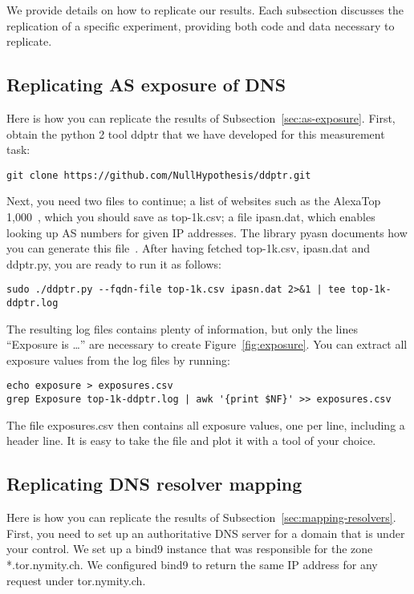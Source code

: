 \appendix

We provide details on how to replicate our results.  Each
subsection discusses the replication of a specific experiment, providing both
code and data necessary to replicate.

\subsection{Replicating AS exposure of DNS}
Here is how you can replicate the results of Subsection~\ref{sec:as-exposure}.
First, obtain the python 2 tool ddptr that we have developed for this
measurement task:

\begin{lstlisting}
git clone https://github.com/NullHypothesis/ddptr.git
\end{lstlisting}

Next, you need two files to continue; \first a list of websites such as the
AlexaTop 1,000~\cite{alexatop1k}, which you should save as top-1k.csv; \second a
file ipasn.dat, which enables looking up AS numbers for given IP addresses.  The
library pyasn documents how you can generate this file~\cite{pyasn}.  After
having fetched top-1k.csv, ipasn.dat and ddptr.py, you are ready to run it as
follows:

\begin{lstlisting}
sudo ./ddptr.py --fqdn-file top-1k.csv ipasn.dat 2>&1 | tee top-1k-ddptr.log
\end{lstlisting}

The resulting log files contains plenty of information, but only the lines
``Exposure is \ldots'' are necessary to create Figure~\ref{fig:exposure}.  You
can extract all exposure values from the log files by running:

\begin{lstlisting}
echo exposure > exposures.csv
grep Exposure top-1k-ddptr.log | awk '{print $NF}' >> exposures.csv
\end{lstlisting}

The file exposures.csv then contains all exposure values, one per line,
including a header line.  It is easy to take the file and plot it with a tool of
your choice.

\subsection{Replicating DNS resolver mapping}
Here is how you can replicate the results of
Subsection~\ref{sec:mapping-resolvers}.  First, you need to set up an
authoritative DNS server for a domain that is under your control.  We set up
a bind9 instance that was responsible for the zone *.tor.nymity.ch.  We
configured bind9 to return the same IP address for any request under
tor.nymity.ch.

